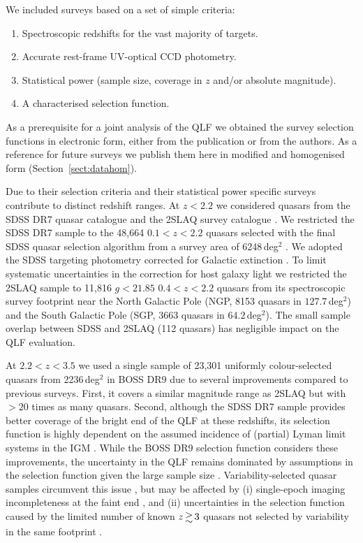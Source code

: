 \documentclass[fleqn,usenatbib]{mnras}
\begin{document}
We included surveys based on a set of simple criteria:
\begin{enumerate}
\item Spectroscopic redshifts for the vast majority of targets.
\item Accurate rest-frame UV-optical CCD photometry.
\item Statistical power (sample size, coverage in $z$ and/or absolute magnitude).
\item A characterised selection function.
\end{enumerate}
As a prerequisite for a joint analysis of the QLF we obtained the
survey selection functions in electronic form, either from the
publication or from the authors. As a reference for future surveys we
publish them here in modified and homogenised form
(Section~\ref{sect:datahom}).

Due to their selection criteria and their statistical power specific
surveys contribute to distinct redshift ranges. At $z<2.2$ we
considered quasars from the SDSS DR7 quasar catalogue
\citep{2010AJ....139.2360S} and the 2SLAQ survey catalogue
\citep{2009MNRAS.392...19C}. We restricted the SDSS DR7 sample to the
48,664 $0.1<z<2.2$ quasars selected with the final SDSS quasar
selection algorithm \citep{2002AJ....123.2945R, 2006AJ....131.2766R}
from a survey area of 6248\,deg$^2$ \citep{2012ApJ...746..169S}. We
adopted the SDSS targeting photometry corrected for Galactic
extinction \citep{2010AJ....139.2360S}. To limit systematic
uncertainties in the correction for host galaxy light
\citep{2009MNRAS.392...19C} we restricted the 2SLAQ sample to 11,816
$g<21.85$ $0.4<z<2.2$ quasars from its spectroscopic survey footprint
near the North Galactic Pole (NGP, 8153 quasars in $127.7$\,deg$^2$)
and the South Galactic Pole (SGP, 3663 quasars in
$64.2$\,deg$^2$). The small sample overlap between SDSS and 2SLAQ (112
quasars) has negligible impact on the QLF evaluation.

At $2.2<z<3.5$ we used a single sample of 23,301 uniformly
colour-selected quasars from 2236\,deg$^2$ in BOSS DR9
\citep{2013ApJ...773...14R} due to several improvements compared to
previous surveys. First, it covers a similar magnitude range as 2SLAQ
but with $>20$ times as many quasars. Second, although the SDSS DR7
sample provides better coverage of the bright end of the QLF at these
redshifts, its selection function is highly dependent on the assumed
incidence of (partial) Lyman limit systems in the IGM
\citep{2009ApJ...705L.113P, 2011ApJ...728...23W}. While the BOSS DR9
selection function considers these improvements, the uncertainty in
the QLF remains dominated by assumptions in the selection function
given the large sample size
\citep{2013ApJ...773...14R}. Variability-selected quasar samples
circumvent this issue \citep{2013ApJ...773...14R, 2013A&A...551A..29P,
  2016A&A...587A..41P}, but may be affected by (i) single-epoch
imaging incompleteness at the faint end \citep{2013ApJ...773...14R},
and (ii) uncertainties in the selection function caused by the limited
number of known $z\ga 3$ quasars not selected by variability in the
same footprint \citep{2013A&A...551A..29P, 2016A&A...587A..41P}.
\end{document}
